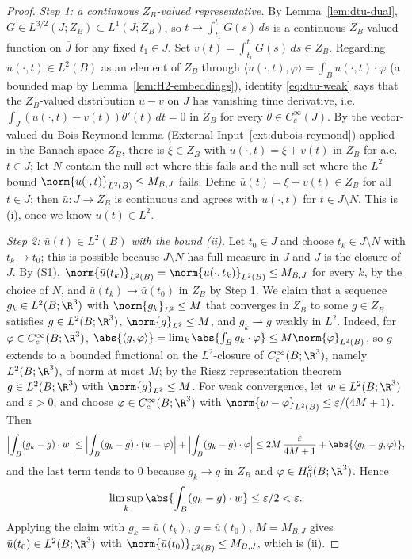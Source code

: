 \documentclass[11pt,reqno]{amsart}
\begin{document}
\begin{proof}
\emph{Step 1: a continuous $Z_{B}$-valued representative.} By
Lemma~\ref{lem:dtu-dual}, $G\in L^{3/2}(J;Z_{B})\subset L^{1}(J;Z_{B})$, so
$t\mapsto\int_{t_{1}}^{t}G(s)\,ds$ is a continuous $Z_{B}$-valued function on
$\overline{J}$ for any fixed $t_{1}\in J$. Set
$v(t)=\int_{t_{1}}^{t}G(s)\,ds\in Z_{B}$. Regarding $u(\cdot,t)\in L^{2}(B)$ as
an element of $Z_{B}$ through $\langle u(\cdot,t),\varphi\rangle
=\int_{B}u(\cdot,t)\cdot\varphi$ (a bounded map by
Lemma~\ref{lem:H2-embeddings}), identity \eqref{eq:dtu-weak} says that the
$Z_{B}$-valued distribution $u-v$ on $J$ has vanishing time derivative, i.e.\
$\int_{J}(u(\cdot,t)-v(t))\theta'(t)\,dt=0$ in $Z_{B}$ for every
$\theta\in C_{c}^{\infty}(J)$. By the vector-valued du Bois-Reymond lemma
(External Input~\ref{ext:dubois-reymond}) applied in the Banach space $Z_{B}$,
there is $\xi\in Z_{B}$ with $u(\cdot,t)=\xi+v(t)$ in $Z_{B}$ for a.e.\ $t\in J$;
let $N$ contain the null set where this fails and the null set where the
$L^{2}$ bound $\norm{u(\cdot,t)}_{L^{2}(B)}\le M_{B,J}$ fails. Define
$\bar u(t)=\xi+v(t)\in Z_{B}$ for all $t\in\overline{J}$; then
$\bar u:\overline{J}\to Z_{B}$ is continuous and agrees with $u(\cdot,t)$ for
$t\in J\setminus N$. This is (i), once we know $\bar u(t)\in L^{2}$.

\emph{Step 2: $\bar u(t)\in L^{2}(B)$ with the bound (ii).} Let
$t_{0}\in\overline{J}$ and choose $t_{k}\in J\setminus N$ with $t_{k}\to t_{0}$;
this is possible because $J\setminus N$ has full measure in $J$ and
$\overline{J}$ is the closure of $J$. By (S1),
$\norm{\bar u(t_{k})}_{L^{2}(B)}=\norm{u(\cdot,t_{k})}_{L^{2}(B)}\le M_{B,J}$
for every $k$, by the choice of $N$, and
$\bar u(t_{k})\to\bar u(t_{0})$ in $Z_{B}$ by Step 1. We claim that a sequence
$g_{k}\in L^{2}(B;\R^{3})$ with $\norm{g_{k}}_{L^{2}}\le M$ that converges in
$Z_{B}$ to some $g\in Z_{B}$ satisfies $g\in L^{2}(B;\R^{3})$,
$\norm{g}_{L^{2}}\le M$, and $g_{k}\rightharpoonup g$ weakly in $L^{2}$. Indeed,
for $\varphi\in C^{\infty}_{c}(B;\R^{3})$,
$\abs{\langle g,\varphi\rangle}=\lim_{k}\abs{\int_{B}g_{k}\cdot\varphi}
\le M\norm{\varphi}_{L^{2}(B)}$, so $g$ extends to a bounded functional on the
$L^{2}$-closure of $C_{c}^{\infty}(B;\R^{3})$, namely $L^{2}(B;\R^{3})$, of norm
at most $M$; by the Riesz representation theorem $g\in L^{2}(B;\R^{3})$ with
$\norm{g}_{L^{2}}\le M$. For weak convergence, let $w\in L^{2}(B;\R^{3})$ and
$\varepsilon>0$, and choose $\varphi\in C_{c}^{\infty}(B;\R^{3})$ with
$\norm{w-\varphi}_{L^{2}(B)}\le\varepsilon/(4M+1)$. Then
\[
  \Bigl|\int_{B}(g_{k}-g)\cdot w\Bigr|
  \le\Bigl|\int_{B}(g_{k}-g)\cdot(w-\varphi)\Bigr|
    +\Bigl|\int_{B}(g_{k}-g)\cdot\varphi\Bigr|
  \le 2M\,\frac{\varepsilon}{4M+1}
    +\abs{\langle g_{k}-g,\varphi\rangle} ,
\]
and the last term tends to $0$ because $g_{k}\to g$ in $Z_{B}$ and
$\varphi\in H^{2}_{0}(B;\R^{3})$. Hence
\[
\limsup_{k}\abs{\int_{B}(g_{k}-g)\cdot w}\le\varepsilon/2<\varepsilon
.
\]
Applying the claim with $g_{k}=\bar u(t_{k})$, $g=\bar u(t_{0})$, $M=M_{B,J}$
gives $\bar u(t_{0})\in L^{2}(B;\R^{3})$ with
$\norm{\bar u(t_{0})}_{L^{2}(B)}\le M_{B,J}$, which is (ii).


\end{proof}
\end{document}

